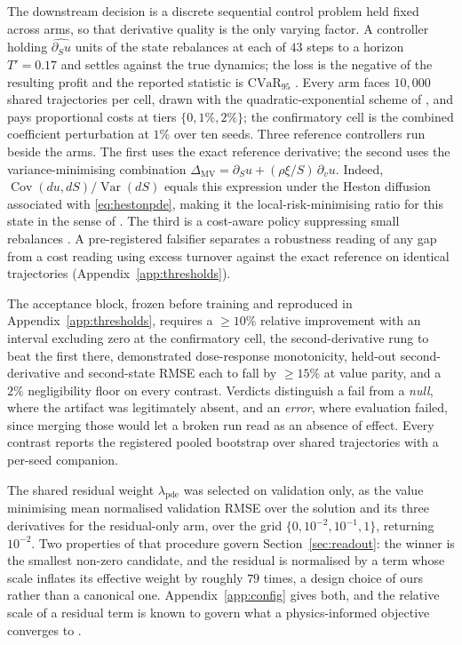 \documentclass{article}
\begin{document}
The downstream decision is a discrete sequential control problem held fixed across
arms, so that derivative quality is the only varying factor. A controller holding
$\widehat{\partial_S u}$ units of the state rebalances at each of $43$ steps to a
horizon $T' = 0.17$ and settles against the true dynamics; the loss is the negative
of the resulting profit and the reported statistic is $\mathrm{CVaR}_{95}$
\citep{rockafellar2000optimization}. Every arm faces $10{,}000$ shared trajectories
per cell, drawn with the quadratic-exponential scheme of
\citet{andersen2008simple}, and pays proportional costs at tiers
$\{0, 1\%, 2\%\}$; the confirmatory cell is the combined coefficient perturbation at
$1\%$ over ten seeds. Three reference controllers run beside the arms. The first
uses the exact reference derivative; the second uses the variance-minimising combination
$\Delta_{\mathrm{MV}} = \partial_S u + (\rho\xi/S)\,\partial_v u$. Indeed,
$\operatorname{Cov}(du,dS)/\operatorname{Var}(dS)$ equals this expression under
the Heston diffusion associated with \eqref{eq:hestonpde}, making it the
local-risk-minimising ratio for this state in the sense of
\citet{follmer1991hedging}. The third is a
cost-aware policy suppressing small rebalances \citep{whalley1997asymptotic}. A
pre-registered falsifier separates a robustness reading of any gap from a cost
reading using excess turnover against the exact reference on identical trajectories
(Appendix~\ref{app:thresholds}).

The acceptance block, frozen before training and reproduced in
Appendix~\ref{app:thresholds}, requires a $\geq 10\%$ relative improvement with an
interval excluding zero at the confirmatory cell, the second-derivative rung to beat
the first there, demonstrated dose-response monotonicity, held-out second-derivative
and second-state RMSE each to fall by $\geq 15\%$ at value parity, and a $2\%$
negligibility floor on every contrast. Verdicts distinguish a fail from a \emph{null}, where the artifact was legitimately
absent, and an \emph{error}, where evaluation failed, since merging those would let
a broken run read as an absence of effect. Every contrast reports the registered
pooled bootstrap over shared trajectories with a per-seed companion.

The shared residual weight $\lambda_{\mathrm{pde}}$ was selected on validation only,
as the value minimising mean normalised validation RMSE over the solution and its
three derivatives for the residual-only arm, over the grid
$\{0, 10^{-2}, 10^{-1}, 1\}$, returning $10^{-2}$. Two properties of that
procedure govern Section~\ref{sec:readout}: the winner is the smallest non-zero
candidate, and the residual is normalised by a term whose scale inflates its
effective weight by roughly $79$ times, a design choice of ours rather than a
canonical one. Appendix~\ref{app:config} gives both, and the relative scale of a
residual term is known to govern what a physics-informed objective converges to
\citep{wang2021understanding}.
\end{document}
